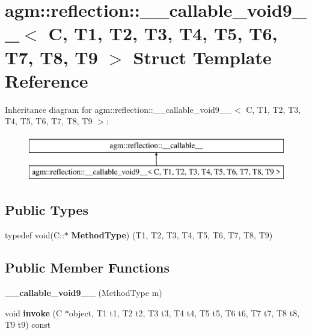 \hypertarget{structagm_1_1reflection_1_1____callable__void9____}{}\section{agm\+:\+:reflection\+:\+:\+\_\+\+\_\+callable\+\_\+void9\+\_\+\+\_\+$<$ C, T1, T2, T3, T4, T5, T6, T7, T8, T9 $>$ Struct Template Reference}
\label{structagm_1_1reflection_1_1____callable__void9____}
Inheritance diagram for agm\+:\+:reflection\+:\+:\+\_\+\+\_\+callable\+\_\+void9\+\_\+\+\_\+$<$ C, T1, T2, T3, T4, T5, T6, T7, T8, T9 $>$\+:\begin{figure}[H]
\begin{center}
\leavevmode
\includegraphics[height=2.000000cm]{structagm_1_1reflection_1_1____callable__void9____}
\end{center}
\end{figure}
\subsection*{Public Types}
\begin{DoxyCompactItemize}
\item 
typedef void(C\+::$\ast$ {\bfseries Method\+Type}) (T1, T2, T3, T4, T5, T6, T7, T8, T9)\hypertarget{structagm_1_1reflection_1_1____callable__void9_____a0f5e874d294623ca7ec013d41f76b4f4}{}\label{structagm_1_1reflection_1_1____callable__void9_____a0f5e874d294623ca7ec013d41f76b4f4}

\end{DoxyCompactItemize}
\subsection*{Public Member Functions}
\begin{DoxyCompactItemize}
\item 
{\bfseries \+\_\+\+\_\+callable\+\_\+void9\+\_\+\+\_\+} (Method\+Type m)\hypertarget{structagm_1_1reflection_1_1____callable__void9_____a95bff4978a11ef1beb9933f7126df3d3}{}\label{structagm_1_1reflection_1_1____callable__void9_____a95bff4978a11ef1beb9933f7126df3d3}

\item 
void {\bfseries invoke} (C $\ast$object, T1 t1, T2 t2, T3 t3, T4 t4, T5 t5, T6 t6, T7 t7, T8 t8, T9 t9) const \hypertarget{structagm_1_1reflection_1_1____callable__void9_____a37cfb7a1ef0cb457ffcf6c830f916571}{}\label{structagm_1_1reflection_1_1____callable__void9_____a37cfb7a1ef0cb457ffcf6c830f916571}

\end{DoxyCompactItemize}
